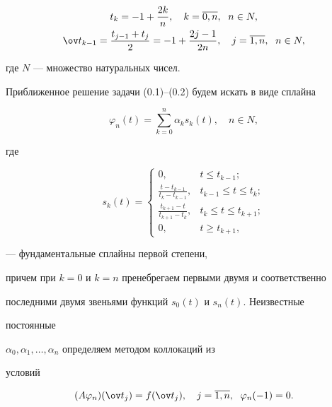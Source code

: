 \begin{gather}


t_k=-1+\frac{2k}{n},\quad  k=\overline{0,n},\ \; n\in N,\\


%


\ov t_{k-1}=\frac{t_{j-1}+t_j}{2}=-1+\frac{2j-1}{2n}, 


\quad j=\overline{1,n},\ \; n\in N, 


\end{gather}


где $N$ --- множество натуральных чисел.


Приближенное решение задачи (0.1)--(0.2) будем искать в виде сплайна


\begin{equation}


\varphi_n(t)=\sum_{k=0}^{n}\alpha_k s_k(t),\quad n\in N,


\end{equation}


где 


\begin{equation}


s_k(t)=


\begin{cases}


0, & t\leq t_{k-1};\\


\frac{t-t_{k-1}}{t_k-t_{k-1}}, & t_{k-1}\leq t\leq t_k;\\


\frac{t_{k+1}-t}{t_{k+1}-t_k}, & t_k\leq t\leq t_{k+1};\\


0, & t\geq t_{k+1},


\end{cases}


\end{equation}


--- фундаментальные сплайны первой степени,


причем при $k=0$ и $k=n$ пренебрегаем первыми двумя и соответственно


последними двумя звеньями функций $s_0(t)$ и $s_n(t)$. Неизвестные 


постоянные


$\alpha_0,\alpha_1,\dotsc,\alpha_n$ определяем методом коллокаций из 


условий


\begin{equation}


(A\varphi_n)(\ov t_j)=f(\ov t_j),\quad j=\overline{1,n},\ \;


\varphi_n(-1)=0.


\end{equation}



